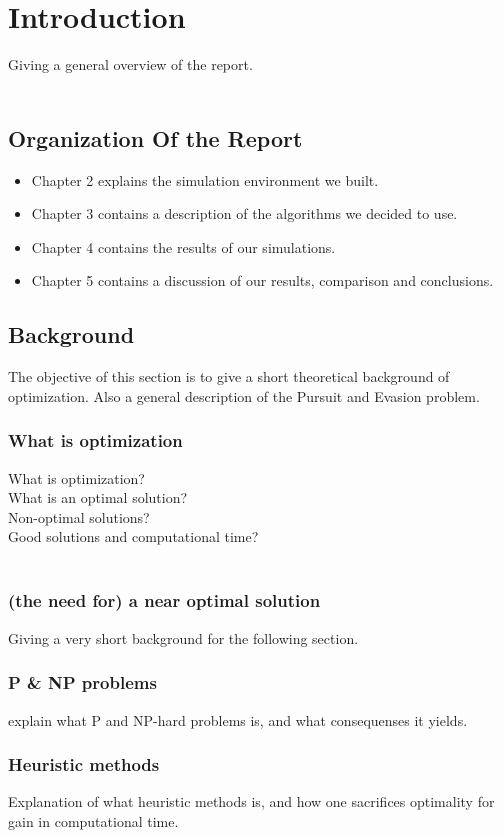 \chapter{Introduction}
Giving a general overview of the report.\\
\\



\section{Organization Of the Report}

\begin{itemize}
\item Chapter 2 explains the simulation environment we built.
\item Chapter 3 contains a description of the algorithms we decided to use.
\item Chapter 4 contains the results of our simulations.
\item Chapter 5 contains a discussion of our results, comparison and conclusions.
\end{itemize}




\section{Background}
The objective of this section is to give a short theoretical
background of optimization. Also a general description of the Pursuit and Evasion problem.
\subsection{What is optimization}
What is optimization?\\
What is an optimal solution?\\
Non-optimal solutions?\\
Good solutions and computational time?\\
\\

\subsection{(the need for) a near optimal solution}
Giving a very short background for the following section. 

\subsection{P \& NP problems}
explain what P and NP-hard problems is, and what consequenses it yields. 

\subsection{Heuristic methods}
Explanation of what heuristic methods is, and how one sacrifices
optimality for gain in computational time.\\